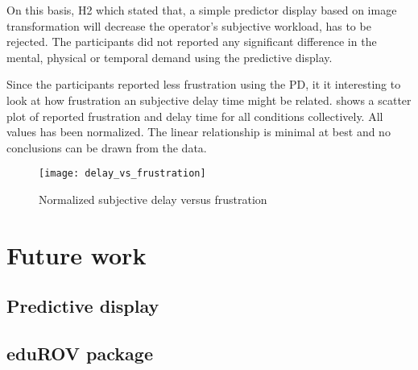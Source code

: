 On this basis, H2 which stated that, a simple predictor display based on image transformation will decrease the operator's subjective workload, has to be rejected. The participants did not reported any significant difference in the mental, physical or temporal demand using the predictive display.

Since the participants reported less frustration using the PD, it it interesting to look at how frustration an subjective delay time might be related.  shows a scatter plot of reported frustration and delay time for all conditions collectively. All values has been normalized. The linear relationship is minimal at best and no conclusions can be drawn from the data.

\begin{figure}[h!]
    \centering
    \texttt{[image: delay\_vs\_frustration]}
    \caption{Normalized subjective delay versus frustration}
    \label{delay_vs_frustration}
\end{figure}



\section{Future work}
\subsection{Predictive display}
\subsection{eduROV package}
